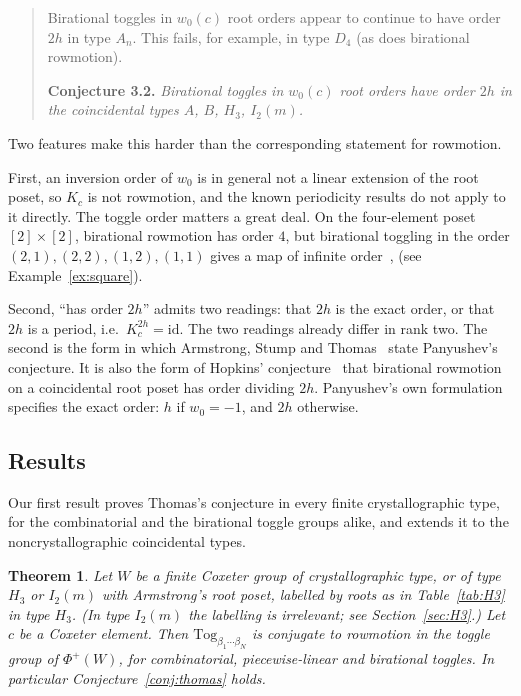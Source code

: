 \documentclass[11pt]{amsart}
\newtheorem{theorem}{Theorem}[section]
\theoremstyle{definition}
\newcommand{\Tog}{\mathrm{Tog}}
\begin{document}
\begin{quote}
Birational toggles in $w_0(c)$ root orders appear to continue to have order $2h$ in type $A_n$. This fails, for example, in type $D_4$ (as does birational rowmotion).

\textbf{Conjecture 3.2.} \emph{Birational toggles in $w_0(c)$ root orders have order $2h$ in the coincidental types $A$, $B$, $H_3$, $I_2(m)$.}
\end{quote}

Two features make this harder than the corresponding statement for rowmotion.

First, an inversion order of $w_0$ is in general not a linear extension of the root poset, so $K_c$ is not rowmotion, and the known periodicity results do not apply to it directly. The toggle order matters a great deal. On the four-element poset $[2]\times[2]$, birational rowmotion has order $4$, but birational toggling in the order $(2,1),(2,2),(1,2),(1,1)$ gives a map of infinite order~\cite[Ex.~2.15]{GR1}, \cite{EP} (see Example~\ref{ex:square}).

Second, ``has order $2h$'' admits two readings: that $2h$ is the exact order, or that $2h$ is a period, i.e.\ $K_c^{2h}=\mathrm{id}$. The two readings already differ in rank two. The second is the form in which Armstrong, Stump and Thomas~\cite{AST} state Panyushev's conjecture. It is also the form of Hopkins' conjecture~\cite[Conj.~4.40]{Hop} that birational rowmotion on a coincidental root poset has order dividing $2h$. Panyushev's own formulation~\cite[Conj.~2.1]{Pan} specifies the exact order: $h$ if $w_0=-1$, and $2h$ otherwise.

\subsection{Results}
Our first result proves Thomas's conjecture in every finite crystallographic type, for the combinatorial and the birational toggle groups alike, and extends it to the noncrystallographic coincidental types.

\begin{theorem}\label{thm:conj}
Let $W$ be a finite Coxeter group of crystallographic type, or of type $H_3$ or $I_2(m)$ with Armstrong's root poset, labelled by roots as in Table~\ref{tab:H3} in type $H_3$. (In type $I_2(m)$ the labelling is irrelevant; see Section~\ref{sec:H3}.) Let $c$ be a Coxeter element. Then $\Tog_{\beta_1\cdots\beta_N}$ is conjugate to rowmotion in the toggle group of $\Phi^+(W)$, for combinatorial, piecewise-linear and birational toggles. In particular Conjecture~\ref{conj:thomas} holds.
\end{theorem}
\end{document}
